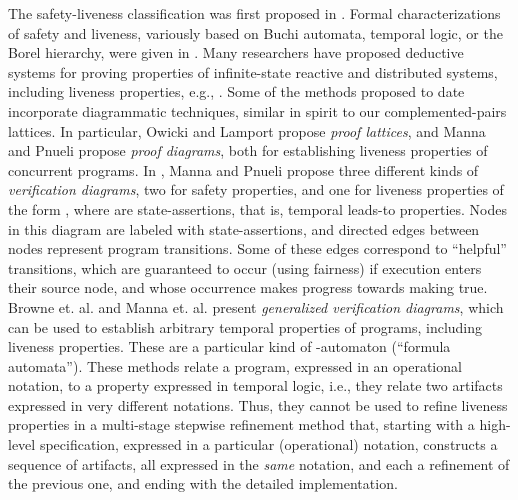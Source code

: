 \documentclass[11pt]{article}
\begin{document}
The safety-liveness classification was first proposed in \cite{Lam77}.
Formal characterizations of safety and liveness, variously based on Buchi
automata, temporal logic, or the Borel hierarchy, 
were given in \cite{AS87,MP90,Sis94}. 
Many researchers have proposed deductive systems for proving
properties of infinite-state reactive and distributed systems, including liveness
properties, e.g., \cite{AS89,Lam94,Lam02,MP91}.
Some of the methods proposed to date incorporate diagrammatic
techniques, similar in spirit to our complemented-pairs
lattices. 
In particular, Owicki and Lamport \cite{OL82} propose \emph{proof lattices},
and Manna and Pnueli \cite{MP83,MP93} propose
\emph{proof diagrams}, both for establishing liveness properties of
concurrent programs. 
In \cite{MP94}, Manna and Pnueli propose three different kinds of 
\emph{verification diagrams}, two for safety properties, and one for
liveness properties of the form 
, where  are state-assertions,
that is, temporal leads-to properties. Nodes in this diagram are
labeled with state-assertions, and directed edges between nodes
represent program transitions. 
Some of these edges correspond to ``helpful'' transitions, which are
guaranteed to occur (using fairness) if execution enters their source
node, and whose occurrence makes progress towards making  true.
Browne et. al. \cite{BMS95} and Manna et. al. \cite{MBSU98} present
\emph{generalized verification diagrams}, 
which can be used to establish arbitrary temporal properties of
programs, including liveness properties. These are a particular kind
of -automaton (``formula automata'').
These methods relate a program, expressed in an operational notation,
to a property expressed in temporal logic, i.e., they relate two
artifacts expressed in very different notations.  Thus, they cannot be
used to refine liveness properties in a multi-stage stepwise
refinement method that, starting with a high-level specification,
expressed in a particular (operational) notation, 
constructs a sequence of artifacts, all expressed in the \emph{same} notation, 
and each a refinement of the previous one, and ending with the
detailed implementation.
\end{document}
